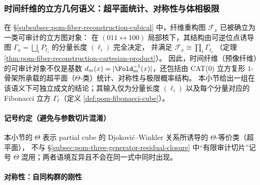 \subsubsection{时间纤维的立方几何语义：超平面统计、对称性与体相极限}\label{subsubsec:pom-fiber-cubical-hyperplane-symmetry-limit}
在 \S\ref{subsubsec:pom-fiber-reconstruction-cubical} 中，纤维重构图 \(\mathcal F_x\) 已被确立为一类可审计的立方图对象：
在 \((011\leftrightarrow 100)\) 局部核下，其结构由可逆位点诱导图 \(\Gamma_x=\bigsqcup_i P_{\ell_i}\) 的分量长度 \((\ell_i)\) 完全决定，
并满足
\(
\mathcal F_x\cong\prod_i \Gamma_{\ell_i}
\)
（定理 \ref{thm:pom-fiber-reconstruction-cartesian-product}）。
因此，时间纤维（预像纤维）的可审计对象不仅是基数 \(d_m(x)=|\Fold_m^{-1}(x)|\)，还包括由 CAT(0) 立方复形 \(1\)-骨架所承载的超平面（\(\Theta\)-类）统计、对称性与极限概率结构。
本小节给出一组在该语义下可独立成文的结论；其输入仅为分量长度 \((\ell_i)\) 以及每个分量对应的 Fibonacci 立方 \(\Gamma_{\ell}\)（定义 \ref{def:pom-fibonacci-cube}）。

\paragraph{记号约定（避免与参数切片混淆）}
本小节的 \(\Theta\) 表示 partial cube 的 Djokovi\'c--Winkler 关系所诱导的 \(\Theta\)-等价类（超平面），
不与 \S\ref{subsec:pom-three-generator-residual-closure} 中“有限审计切片”记号 \(\Theta\) 混用；两者语境互异且不会在同一式中同时出现。

\paragraph{对称性：自同构群的刚性}

